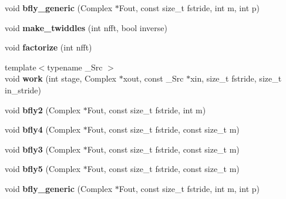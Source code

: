 \begin{DoxyCompactItemize}
\mbox{\label{struct_eigen_1_1internal_1_1kiss__cpx__fft_ade4207c7737f57f4b38f7aa9d2f007cf}} 
void {\bfseries bfly\+\_\+generic} (Complex $\ast$Fout, const size\+\_\+t fstride, int m, int p)
\item 
\mbox{\label{struct_eigen_1_1internal_1_1kiss__cpx__fft_a85cd6612b484e94c4b0ae3aaff4a3ca8}} 
void {\bfseries make\+\_\+twiddles} (int nfft, bool inverse)
\item 
\mbox{\label{struct_eigen_1_1internal_1_1kiss__cpx__fft_a61700af00cc2068ccc57003333a23ad1}} 
void {\bfseries factorize} (int nfft)
\item 
\mbox{\label{struct_eigen_1_1internal_1_1kiss__cpx__fft_a7ea71feb0d8704656596f2909dba9271}} 
{\footnotesize template$<$typename \+\_\+\+Src $>$ }\\void {\bfseries work} (int stage, Complex $\ast$xout, const \+\_\+\+Src $\ast$xin, size\+\_\+t fstride, size\+\_\+t in\+\_\+stride)
\item 
\mbox{\label{struct_eigen_1_1internal_1_1kiss__cpx__fft_a79580867cbe4b457c42b21745789b362}} 
void {\bfseries bfly2} (Complex $\ast$Fout, const size\+\_\+t fstride, int m)
\item 
\mbox{\label{struct_eigen_1_1internal_1_1kiss__cpx__fft_aa5c67750f3ced8773739a0ba964e2485}} 
void {\bfseries bfly4} (Complex $\ast$Fout, const size\+\_\+t fstride, const size\+\_\+t m)
\item 
\mbox{\label{struct_eigen_1_1internal_1_1kiss__cpx__fft_a91e8db66ee520362382a514b8784c307}} 
void {\bfseries bfly3} (Complex $\ast$Fout, const size\+\_\+t fstride, const size\+\_\+t m)
\item 
\mbox{\label{struct_eigen_1_1internal_1_1kiss__cpx__fft_a62690918301f7eb99af959474f7ea9d6}} 
void {\bfseries bfly5} (Complex $\ast$Fout, const size\+\_\+t fstride, const size\+\_\+t m)
\item 
\mbox{\label{struct_eigen_1_1internal_1_1kiss__cpx__fft_ade4207c7737f57f4b38f7aa9d2f007cf}} 
void {\bfseries bfly\+\_\+generic} (Complex $\ast$Fout, const size\+\_\+t fstride, int m, int p)
\end{DoxyCompactItemize}
